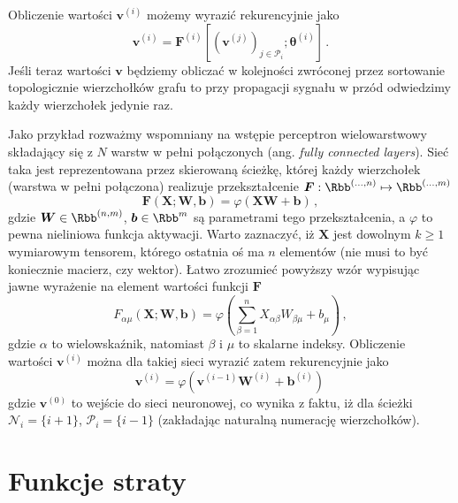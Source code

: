 \documentclass{myclass}
\begin{document}
Obliczenie wartości \(\bm{v}^{(i)}\) możemy wyrazić rekurencyjnie jako
\[\boxed{
    \bm{v}^{(i)} = \bm{F}^{(i)}\left[ \left(\bm{v}^{(j)}\right)_{j \in \mathscr{P}_i}; \bm{\theta}^{(i)}\right] \,.
}\]
Jeśli teraz wartości \(\bm{v}\) będziemy obliczać w kolejności zwróconej przez sortowanie
topologicznie wierzchołków grafu to przy propagacji sygnału w przód odwiedzimy każdy wierzchołek
jedynie raz.

Jako przykład rozważmy wspomniany na wstępie perceptron wielowarstwowy składający się z \(N\) warstw
w pełni połączonych (ang. \emph{fully connected layers}). Sieć taka jest reprezentowana przez
skierowaną ścieżkę, której każdy wierzchołek (warstwa w pełni połączona) realizuje przekształcenie
\(\bm{F}: \Rbb^{(\ldots, n)} \mapsto \Rbb^{(\ldots, m)}\)
\[
    \bm{F}(\bm{X} ; \bm{W}, \bm{b}) = \varphi \left( \bm{X} \bm{W} + \bm{b} \right) \,,
\]
gdzie \(\bm{W} \in \Rbb^{(n, m)}\), \(\bm{b} \in \Rbb^m\) są parametrami tego przekształcenia, a
\(\varphi\) to pewna nieliniowa funkcja aktywacji. Warto zaznaczyć, iż \(\bm{X}\) jest dowolnym \(k
\geq 1\) wymiarowym tensorem, którego ostatnia oś ma \(n\) elementów (nie musi to być koniecznie
macierz, czy wektor). Łatwo zrozumieć powyższy wzór wypisując jawne wyrażenie na element wartości
funkcji \(\bm{F}\) 
\[
    F_{\alpha\mu}(\bm{X} ; \bm{W}, \bm{b}) = \varphi \left( \sum_{\beta=1}^{n} X_{\alpha\beta} W_{\beta\mu} + b_{\mu}\right)\,,
\]
gdzie \(\alpha\) to wielowskaźnik, natomiast \(\beta\) i \(\mu\) to skalarne indeksy. Obliczenie
wartości \(\bm{v}^{(i)}\) można dla takiej sieci wyrazić zatem rekurencyjnie jako
\[
    \bm{v}^{(i)} = \varphi \left( \bm{v}^{(i-1)} \bm{W}^{(i)} + \bm{b}^{(i)} \right)\,
\]
gdzie \(\bm{v}^{(0)}\) to wejście do sieci neuronowej, co wynika z faktu, iż dla ścieżki
\(\mathscr{N}_i = \{i+1\}\), \(\mathscr{P}_i = \{i-1\}\) (zakładając naturalną numerację
wierzchołków).


\section{Funkcje straty}
\end{document}
